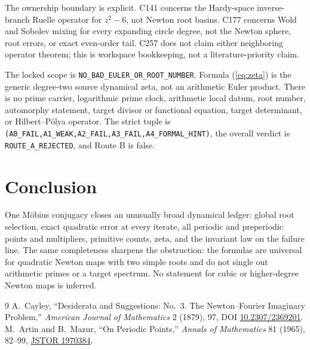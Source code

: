 \documentclass[10pt]{article}
\begin{document}
The ownership boundary is explicit.  C141 concerns the Hardy-space
inverse-branch Ruelle operator for \(z^2-6\), not Newton root basins.  C177
concerns Wold and Sobolev mixing for every expanding circle degree, not the
Newton sphere, root errors, or exact even-order tail.  C257 does not claim
either neighboring operator theorem; this is workspace bookkeeping, not a
literature-priority claim.

The locked scope is \texttt{NO\_BAD\_EULER\_OR\_ROOT\_NUMBER}.  Formula
(\ref{eq:zeta}) is the generic degree-two source dynamical zeta, not an
arithmetic Euler product.  There is no prime carrier, logarithmic prime clock,
arithmetic local datum, root number, automorphy statement, target divisor or
functional equation, target determinant, or Hilbert--Pólya operator.  The
strict tuple is
\texttt{(A0\_FAIL,A1\_WEAK,A2\_FAIL,A3\_FAIL,A4\_FORMAL\_HINT)}, the
overall verdict is \texttt{ROUTE\_A\_REJECTED}, and Route B is false.
\fi

\section{Conclusion}
One Möbius conjugacy closes an unusually broad dynamical ledger: global root
selection, exact quadratic error at every iterate, all periodic and
preperiodic points and multipliers, primitive counts, zeta, and the invariant
law on the failure line.  The same completeness sharpens the obstruction:
the formulas are universal for quadratic Newton maps with two simple roots
and do not single out arithmetic primes or a target spectrum.  No statement
for cubic or higher-degree Newton maps is inferred.

\begin{thebibliography}{9}
 A.~Cayley, ``Desiderata and Suggestions: No.~3. The
Newton--Fourier Imaginary Problem,'' \emph{American Journal of Mathematics}
2 (1879), 97, DOI
\href{https://doi.org/10.2307/2369201}{10.2307/2369201}.
 M.~Artin and B.~Mazur, ``On Periodic Points,''
\emph{Annals of Mathematics} 81 (1965), 82--99,
\href{https://www.jstor.org/stable/1970384}{JSTOR 1970384}.
\end{thebibliography}
\end{document}

